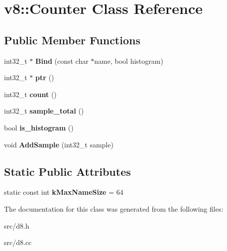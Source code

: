 \hypertarget{classv8_1_1_counter}{}\section{v8\+:\+:Counter Class Reference}
\label{classv8_1_1_counter}
\subsection*{Public Member Functions}
\begin{DoxyCompactItemize}
\item 
\hypertarget{classv8_1_1_counter_a3d5c1db6f1a16fb30682fe0872d1850b}{}int32\+\_\+t $\ast$ {\bfseries Bind} (const char $\ast$name, bool histogram)\label{classv8_1_1_counter_a3d5c1db6f1a16fb30682fe0872d1850b}

\item 
\hypertarget{classv8_1_1_counter_a9b621d24818a32d04673b4f3abc55603}{}int32\+\_\+t $\ast$ {\bfseries ptr} ()\label{classv8_1_1_counter_a9b621d24818a32d04673b4f3abc55603}

\item 
\hypertarget{classv8_1_1_counter_abb91bdeaa89a1055f5566414d42ac7cb}{}int32\+\_\+t {\bfseries count} ()\label{classv8_1_1_counter_abb91bdeaa89a1055f5566414d42ac7cb}

\item 
\hypertarget{classv8_1_1_counter_a932e1cf3d4e1ad83ec279f14e9df3453}{}int32\+\_\+t {\bfseries sample\+\_\+total} ()\label{classv8_1_1_counter_a932e1cf3d4e1ad83ec279f14e9df3453}

\item 
\hypertarget{classv8_1_1_counter_abec9d55ada4b4407b00edbc02e2ab74e}{}bool {\bfseries is\+\_\+histogram} ()\label{classv8_1_1_counter_abec9d55ada4b4407b00edbc02e2ab74e}

\item 
\hypertarget{classv8_1_1_counter_ae66b172d2409a791fdcb9836037b8a1b}{}void {\bfseries Add\+Sample} (int32\+\_\+t sample)\label{classv8_1_1_counter_ae66b172d2409a791fdcb9836037b8a1b}

\end{DoxyCompactItemize}
\subsection*{Static Public Attributes}
\begin{DoxyCompactItemize}
\item 
\hypertarget{classv8_1_1_counter_a706545f71074bdbebc9def4f07c76c85}{}static const int {\bfseries k\+Max\+Name\+Size} = 64\label{classv8_1_1_counter_a706545f71074bdbebc9def4f07c76c85}

\end{DoxyCompactItemize}


The documentation for this class was generated from the following files\+:\begin{DoxyCompactItemize}
\item 
src/d8.\+h\item 
src/d8.\+cc\end{DoxyCompactItemize}
